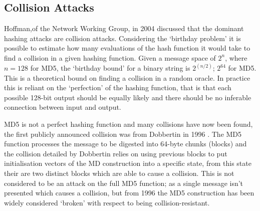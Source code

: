 \documentclass[a4paper,12pt]{article}
\begin{document}
\subsection{Collision Attacks}
Hoffman,of the Network Working Group, in 2004 discussed that the dominant hashing attacks are collision attacks. Considering the `birthday problem' it is possible to estimate how many evaluations of the hash function it would take to find a collision in a given hashing function. Given a message space of  $2^n$, where $n = 128$ for MD5, the `birthday bound' for a binary string is $2^{(n/2)}$; $2^{64}$ for MD5. This is a theoretical bound on finding a collision in a random oracle. In practice this is reliant on the `perfection' of the hashing function, that is that each possible 128-bit output should be equally likely and there should be no inferable connection between input and output. 

MD5 is not a perfect hashing function and many collisions have now been found, the first publicly announced collision was from Dobbertin in 1996 \cite{dobbertin}. The MD5 function processes the message to be digested into 64-byte chunks (blocks) and the collision detailed by Dobbertin relies on using previous blocks to put initialisation vectors of the MD construction into a specific state, from this state their are two distinct blocks which are able to cause a collision. This is not considered to be an attack on the full MD5 function; as a single message isn’t presented which causes a collision, but from 1996 the MD5 construction has been widely considered `broken’ with respect to being collision-resistant.
\end{document}
